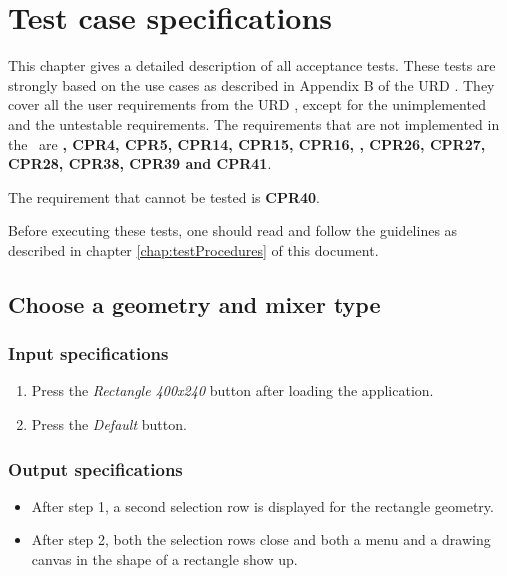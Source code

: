 \chapter{Test case specifications}
\label{chap:testCaseSpecs}
\renewcommand{\atref}[1]{AT\ref{at:#1}}

This chapter gives a detailed description of all acceptance tests. These tests are strongly based on the use cases as described in Appendix B of the URD \cite{urd}. They cover all the user requirements from the URD \cite{urd}, except for the unimplemented and the untestable requirements.
The requirements that are not implemented in the \applicationname\ are \textbf{, CPR4, CPR5, CPR14, CPR15, CPR16, , CPR26, CPR27, CPR28, CPR38, CPR39 and CPR41}.

The requirement that cannot be tested is \textbf{CPR40}.

Before executing these tests, one should read and follow the guidelines as described in chapter \ref{chap:testProcedures} of this document.

\section{Choose a geometry and mixer type}

\subsection*{Input specifications}
\begin{enumerate}
\item Press the \emph{Rectangle 400x240} button after loading the application.
\item Press the \emph{Default} button.
\end{enumerate}

\subsection*{Output specifications}
\begin{itemize}
\item After step 1, a second selection row is displayed for the rectangle geometry.
\item After step 2, both the selection rows close and both a menu and a drawing canvas in the shape of a rectangle show up.
\end{itemize}
 
